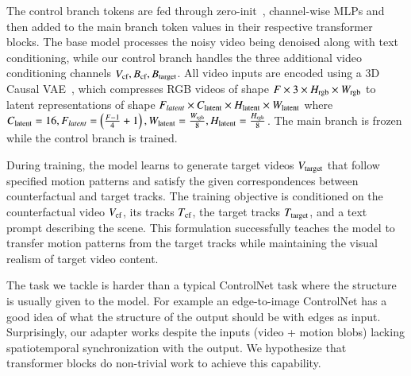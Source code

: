 The control branch tokens are fed through zero-init~\cite{controlnet2023}, channel-wise MLPs and then added to the main branch token values in their respective transformer blocks. The base model processes the noisy video being denoised along with text conditioning, while our control branch handles the three additional video conditioning channels $V_{\text{cf}}, B_{\text{cf}}, B_{\text{target}}$. All video inputs are encoded using a 3D Causal VAE~\cite{cogvideox2024}, which compresses RGB videos of shape $F \times 3 \times H_{\text{rgb}} \times W_{\text{rgb}}$ to latent representations of shape $F_{latent} \times C_{\text{latent}} \times H_{\text{latent}} \times W_{\text{latent}}$ where $C_{\text{latent}} = 16, F_{latent}=\left(\frac{F-1}{4}+1\right), W_{\text{latent}}=\frac{W_{\text{rgb}}}{8}, H_{\text{latent}}=\frac{H_{\text{rgb}}}{8}$. The main branch is frozen while the control branch is trained.

During training, the model learns to generate target videos $V_{\text{target}}$ that follow specified motion patterns and satisfy the given correspondences between counterfactual and target tracks. The training objective is conditioned on the counterfactual video $V_{\text{cf}}$, its tracks $T_{\text{cf}}$, the target tracks $T_{\text{target}}$, and a text prompt describing the scene. This formulation successfully teaches the model to transfer motion patterns from the target tracks while maintaining the visual realism of target video content.

The task we tackle is harder than a typical ControlNet task where the structure is usually given to the model. For example an edge-to-image ControlNet has a good idea of what the structure of the output should be with edges as input. Surprisingly, our adapter works despite the inputs (video + motion blobs) lacking spatiotemporal synchronization with the output. We hypothesize that transformer blocks do non-trivial work to achieve this capability.
